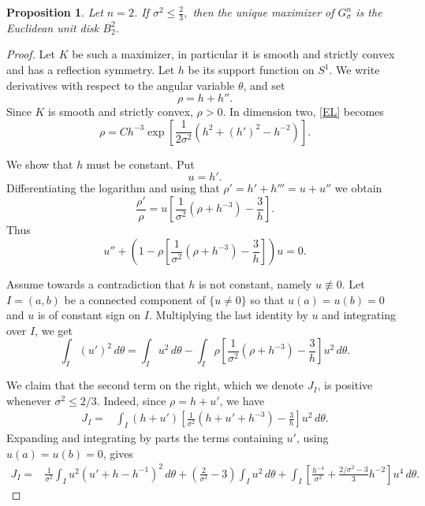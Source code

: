 \documentclass[12pt,oneside,reqno]{amsart}
\numberwithin{equation}{section}
\newtheorem{proposition}[theorem]{Proposition}
\theoremstyle{remark}
\begin{document}
\begin{proposition}
\label{prop:planar}
Let \(n=2\). If
$ \sigma^2\le \frac23,
      $
then the unique maximizer of $G^n_\sigma$
is the Euclidean unit disk \(B_2^2\).
\end{proposition}

\begin{proof}
Let \(K\) be such a maximizer, in particular it is smooth and strictly convex and has a reflection symmetry. Let \(h\) be its support function
on \(  S^1\). We write derivatives with respect to the angular
variable \(\theta\), and set
\[
        \rho=h+h''.
\]
Since \(K\) is smooth and strictly convex, \(\rho>0\). In dimension two, \eqref{EL} becomes
\[
        \rho
        =
        C h^{-3}
        \exp\left[
        \frac{1}{2\sigma^2}
        \left(h^2+(h')^2-h^{-2}\right)
        \right].
\]

We show that \(h\) must be constant. Put
\[
        u=h'.
\]
Differentiating the logarithm  and using that $ \rho'=h'+h'''=u+u''$
we obtain
\[
        \frac{\rho'}{\rho}
        =
        u\left[
        \frac{1}{\sigma^2}(\rho+h^{-3})-\frac3h
        \right].
\]
Thus
\[
        u''
        +
        \left(
        1-\rho\left[
        \frac{1}{\sigma^2}(\rho+h^{-3})-\frac3h
        \right]
        \right)u
        =
        0.
\]

Assume towards a contradiction that \(h\) is not constant, namely  \(u\not\equiv0\).
Let \(I=(a,b)\) be a connected component of \(\{u\ne0\}\) so that 
$ u(a)=u(b)=0$ and $u$ is of constant sign on $I$. 
Multiplying the last identity by \(u\) and integrating
over \(I\), we get
\[
        \int_I (u')^2\,d\theta
        =
        \int_I u^2\,d\theta
        -
        \int_I
        \rho\left[
        \frac{1}{\sigma^2}(\rho+h^{-3})-\frac3h
        \right]u^2\,d\theta .
\]
 

We claim that the second term on the right, which we denote \(J_I\), is positive whenever \(\sigma^2\le 2/3\). Indeed, since
$\rho=h+u'$,
we have
\[
\begin{aligned}
J_I
={}&
\int_I
(h+u')
\left[
\frac{1}{\sigma^2}(h+u'+h^{-3})-\frac3h
\right]u^2\,d\theta .
\end{aligned}
\]
Expanding and integrating by parts the terms containing \(u'\), using
\(u(a)=u(b)=0\), gives
\[
\begin{aligned}
J_I
={}&
\frac{1}{\sigma^2}\int_I
u^2\left(u'+h-h^{-1}\right)^2\,d\theta  
+
(\frac{2}{\sigma^2}-3)\int_Iu^2\,d\theta  +
\int_I
\left[
\frac{h^{-4}}{\sigma^2}  
+
\frac{2/\sigma^2-3}{3}h^{-2}
\right]u^4\,d\theta .
\end{aligned}
\]



\end{proof}
\end{document}
